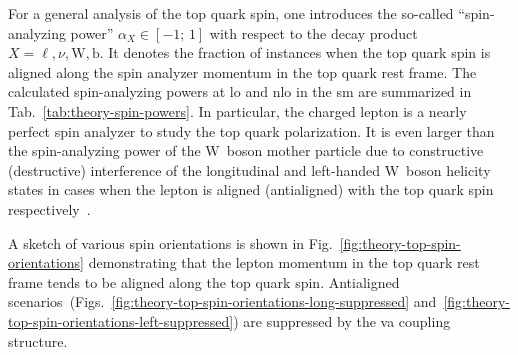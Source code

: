 For a general analysis of the top quark spin, one introduces the so-called ``spin-analyzing power'' $\alpha_{X}\in[-1;\,1]$ with respect to the decay product $X=\ell,\nu,\mathrm{W},\mathrm{b}$. It denotes the fraction of instances when the top quark spin is aligned along the spin analyzer momentum in the top quark rest frame. The calculated spin-analyzing powers at \gls{lo} and \gls{nlo} in the \gls{sm} are summarized in Tab.~\ref{tab:theory-spin-powers}. In particular, the charged lepton is a nearly perfect spin analyzer to study the top quark polarization. It is even larger than the spin-analyzing power of the $\mathrm{W}$~boson mother particle due to constructive (destructive) interference of the longitudinal and left-handed $\mathrm{W}$~boson helicity states in cases when the lepton is aligned (antialigned) with the top quark spin respectively~\cite{Bernreuther:2008ju}.

A sketch of various spin orientations is shown in Fig.~\ref{fig:theory-top-spin-orientations} demonstrating that the lepton momentum in the top quark rest frame tends to be aligned along the top quark spin. Antialigned scenarios~(Figs.~\ref{fig:theory-top-spin-orientations-long-suppressed} and~\ref{fig:theory-top-spin-orientations-left-suppressed}) are suppressed by the \gls{va} coupling structure.

